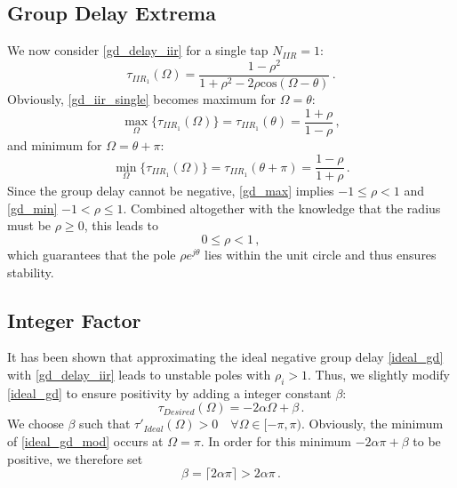 \documentclass[paper=a4, fontsize=11pt]{scrartcl} %
\numberwithin{equation}{section} %
\numberwithin{figure}{section} %
\numberwithin{table}{section} %
\begin{document}
\subsection{Group Delay Extrema}

We now consider \eqref{gd_delay_iir} for a single tap $N_{IIR}=1$:
\begin{equation} 
\tau_{IIR_1}(\Omega)=\frac{1-\rho^2}{1+\rho^2-2\rho\text{cos}(\Omega-\theta)}\label{gd_iir_single}\, .
\end{equation}
Obviously, \eqref{gd_iir_single} becomes maximum for $\Omega=\theta$:
\begin{equation} 
\underset{\Omega}{\operatorname{max}}\{\tau_{IIR_1}(\Omega)\}=\tau_{IIR_1}(\theta)=\frac{1+\rho}{1-\rho}\label{gd_max}\, ,
\end{equation}
and minimum for $\Omega=\theta+\pi$:
\begin{equation} 
\underset{\Omega}{\operatorname{min}}\{\tau_{IIR_1}(\Omega)\}=\tau_{IIR_1}(\theta+\pi)=\frac{1-\rho}{1+\rho}\label{gd_min}\, .
\end{equation}
Since the group delay cannot be negative, \eqref{gd_max} implies $-1\leq\rho<1$ and \eqref{gd_min} $-1<\rho\leq1$. Combined altogether with the knowledge that the radius must be $\rho\geq0$, this leads to
\begin{equation} 
0\leq\rho<1\label{rho_constraint}\, ,
\end{equation}
which guarantees that the pole $\rho e^{j\theta}$ lies within the unit circle and thus ensures stability.


\subsection{Integer Factor}

It has been shown that approximating the ideal negative group delay \eqref{ideal_gd} with \eqref{gd_delay_iir} leads to unstable poles with $\rho_i>1$. Thus, we slightly modify \eqref{ideal_gd} to ensure positivity by adding a integer constant $\beta$:
\begin{equation} 
\tau_{Desired}(\Omega)=-2\alpha\Omega+\beta\label{ideal_gd_mod}\, .
\end{equation}
We choose $\beta$ such that $\tau'_{Ideal}(\Omega)>0 \quad \forall \Omega \in [-\pi,\pi)$. Obviously, the minimum of \eqref{ideal_gd_mod} occurs at $\Omega=\pi$. In order for this minimum $-2\alpha\pi+\beta$ to be positive, we therefore set
\begin{equation} 
\beta=\lceil2\alpha\pi\rceil>2\alpha\pi\label{beta}\, .
\end{equation}
\end{document}
